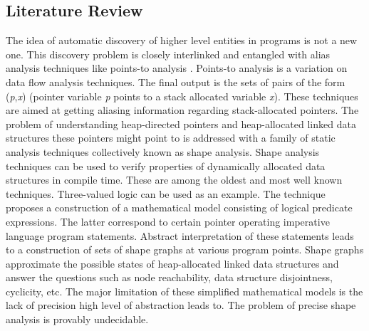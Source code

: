 \subsection{Literature Review}
\label{background_dcp_literature_review}
\quad The idea of automatic discovery of higher level entities in programs is not a new one. This discovery problem is closely interlinked and entangled with alias analysis techniques \cite{Muchnick:1998:ACD:286076} like points-to analysis \cite{Emami:1994:CIP:178243.178264}. Points-to analysis is a variation on data flow analysis techniques. The final output is the sets of pairs of the form (\textit{p},\textit{x}) (pointer variable \textit{p} points to a stack allocated variable \textit{x}). These techniques are aimed at getting aliasing information regarding stack-allocated pointers.\newline\null
\quad The problem of understanding heap-directed pointers and heap-allocated linked data structures these pointers might point to is addressed with a family of static analysis techniques collectively known as shape analysis. Shape analysis techniques can be used to verify properties of dynamically allocated data structures in compile time. These are among the oldest and most well known techniques. Three-valued logic \cite{Sagiv:1999:PSA:292540.292552}\cite{Wilhelm:2000:SA:647476.760384} can be used as an example. The technique proposes a construction of a mathematical model consisting of logical predicate expressions. The latter correspond to certain pointer operating imperative language program statements. Abstract interpretation of these statements leads to a construction of sets of shape graphs at various program points. Shape graphs approximate the possible states of heap-allocated linked data structures and answer the questions such as node reachability, data structure disjointness, cyclicity, etc. The major limitation of these simplified mathematical models is the lack of precision high level of abstraction leads to. The problem of precise shape analysis is provably undecidable.\newline\null
